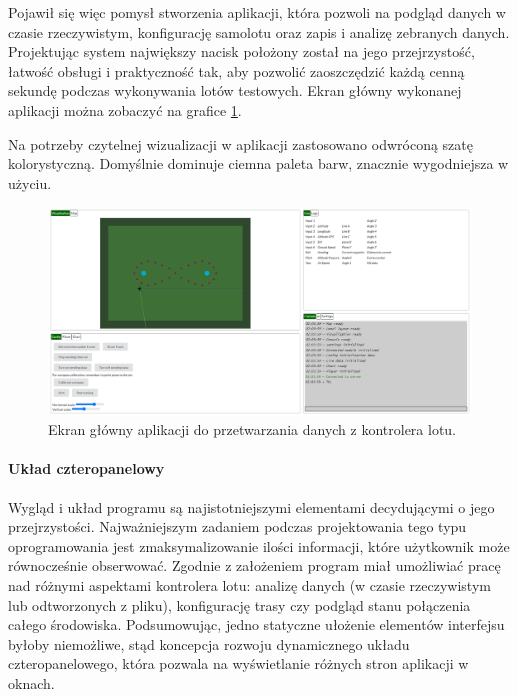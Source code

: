 \documentclass[12pt, a4paper]{article}
\begin{document}
Pojawił się więc pomysł stworzenia aplikacji, która pozwoli na podgląd danych w czasie rzeczywistym, konfigurację samolotu oraz zapis i analizę zebranych danych. Projektując system największy nacisk położony został na jego przejrzystość, łatwość obsługi i praktyczność tak, aby pozwolić zaoszczędzić każdą cenną sekundę podczas wykonywania lotów testowych. Ekran główny wykonanej aplikacji można zobaczyć na grafice \ref{fig:weball}.

Na potrzeby czytelnej wizualizacji w aplikacji zastosowano odwróconą szatę kolorystyczną. Domyślnie dominuje ciemna paleta barw, znacznie wygodniejsza w użyciu.

 \begin{figure}[ht]
    \centering
    \includegraphics[width=1\textwidth]{weball}
    \caption{Ekran główny aplikacji do przetwarzania danych z kontrolera lotu.}
    \label{fig:weball}
\end{figure}

\paragraph{Układ czteropanelowy}\mbox{}

Wygląd i układ programu są najistotniejszymi elementami decydującymi o jego przejrzystości. Najważniejszym zadaniem podczas projektowania tego typu oprogramowania jest zmaksymalizowanie ilości informacji, które użytkownik może równocześnie obserwować. Zgodnie z założeniem program  miał umożliwiać pracę nad różnymi aspektami kontrolera lotu: analizę danych (w czasie rzeczywistym lub odtworzonych z pliku), konfigurację trasy czy podgląd stanu połączenia całego środowiska. Podsumowując, jedno statyczne ułożenie elementów interfejsu byłoby niemożliwe, stąd koncepcja rozwoju dynamicznego układu czteropanelowego, która pozwala na wyświetlanie różnych stron aplikacji w oknach.
\end{document}
